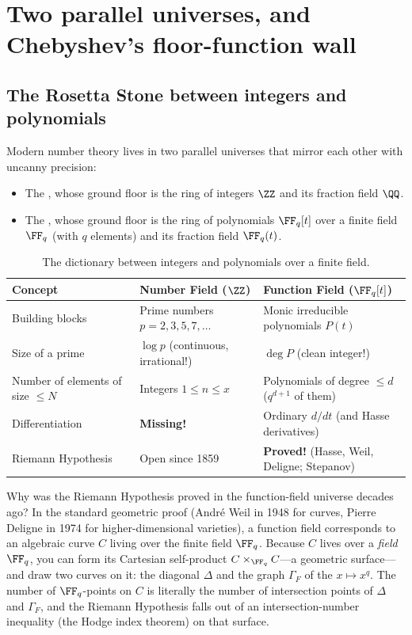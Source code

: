 \section{Two parallel universes, and Chebyshev's floor-function wall}

\subsection{The Rosetta Stone between integers and polynomials}

Modern number theory lives in two parallel universes that mirror each other with uncanny precision:
\begin{itemize}
  \item The , whose ground floor is the ring of integers \(\ZZ\) and its fraction field \(\QQ\).
  \item The , whose ground floor is the ring of polynomials \(\FF_q[t]\) over a finite field \(\FF_q\) (with \(q\) elements) and its fraction field \(\FF_q(t)\).
\end{itemize}

\begin{table}[htbp]
\centering
\renewcommand{\arraystretch}{1.2}
\begin{tabularx}{\linewidth}{@{}lYY@{}}
\toprule
\textbf{Concept} & \textbf{Number Field (\(\ZZ\))} & \textbf{Function Field (\(\FF_q[t]\))} \\
\midrule
Building blocks & Prime numbers \(p = 2, 3, 5, 7, \dots\) & Monic irreducible polynomials \(P(t)\) \\
Size of a prime & \(\log p\) (continuous, irrational!) & \(\deg P\) (clean integer!) \\
Number of elements of size \(\le N\) & Integers \(1 \le n \le x\) & Polynomials of degree \(\le d\) (\(q^{d+1}\) of them) \\
Differentiation & \textbf{Missing!} & Ordinary \(d/dt\) (and Hasse derivatives) \\
Riemann Hypothesis & Open since 1859 & \textbf{Proved!} (Hasse, Weil, Deligne; Stepanov) \\
\bottomrule
\end{tabularx}
\caption{The dictionary between integers and polynomials over a finite field.}
\label{tab:N20261125-dictionary}
\end{table}

Why was the Riemann Hypothesis proved in the function-field universe decades ago? In the standard geometric proof (Andr\'e Weil in 1948 for curves, Pierre Deligne in 1974 for higher-dimensional varieties), a function field corresponds to an algebraic curve \(C\) living over the finite field \(\FF_q\). Because \(C\) lives over a \emph{field} \(\FF_q\), you can form its Cartesian self-product \(C \times_{\FF_q} C\)---a geometric surface---and draw two curves on it: the diagonal \(\Delta\) and the graph \(\Gamma_F\) of the  \(x \mapsto x^q\). The number of \(\FF_q\)-points on \(C\) is literally the number of intersection points of \(\Delta\) and \(\Gamma_F\), and the Riemann Hypothesis falls out of an intersection-number inequality (the Hodge index theorem) on that surface.

